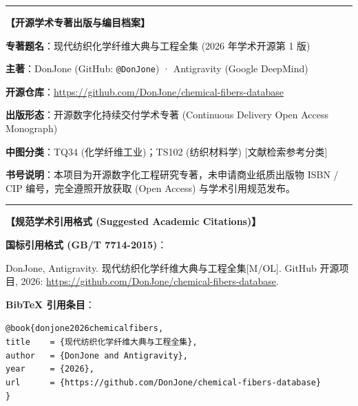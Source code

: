 \documentclass[11pt,openright,twoside,UTF8]{ctexbook}
\begin{document}
\vspace{0.6cm}

\begin{center}
\begin{minipage}{0.88\textwidth}
\small
\noindent\rule{\textwidth}{0.8pt}\par
\vspace{0.3cm}
\noindent\textbf{【开源学术专著出版与编目档案】}\par
\vspace{0.2cm}
\noindent\textbf{专著题名}：现代纺织化学纤维大典与工程全集 (2026 年学术开源第 1 版)\par
\noindent\textbf{主\quad\quad 著}：DonJone (GitHub: \texttt{@DonJone}) · Antigravity (Google DeepMind)\par
\noindent\textbf{开源仓库}：\url{https://github.com/DonJone/chemical-fibers-database}\par
\noindent\textbf{出版形态}：开源数字化持续交付学术专著 (Continuous Delivery Open Access Monograph)\par
\noindent\textbf{中图分类}：TQ34 (化学纤维工业)；TS102 (纺织材料学) [文献检索参考分类]\par
\noindent\textbf{书号说明}：本项目为开源数字化工程研究专著，未申请商业纸质出版物 ISBN / CIP 编号，完全遵照开放获取 (Open Access) 与学术引用规范发布。\par
\vspace{0.2cm}
\noindent\rule{\textwidth}{0.8pt}
\end{minipage}
\end{center}

\vspace{0.5cm}

\begin{center}
\begin{minipage}{0.88\textwidth}
\small
\noindent\textbf{【规范学术引用格式 (Suggested Academic Citations)】}\par
\vspace{0.2cm}
\noindent\textbf{国标引用格式 (GB/T 7714-2015)}：\par
\noindent DonJone, Antigravity. 现代纺织化学纤维大典与工程全集[M/OL]. GitHub 开源项目, 2026: \url{https://github.com/DonJone/chemical-fibers-database}.\par
\vspace{0.3cm}
\noindent\textbf{BibTeX 引用条目}：\par
\vspace{0.1cm}
\noindent\texttt{@book\{donjone2026chemicalfibers,}\\
\noindent\texttt{\quad title\ \ \ \ = \{现代纺织化学纤维大典与工程全集\},}\\
\noindent\texttt{\quad author\ \ \ = \{DonJone and Antigravity\},}\\
\noindent\texttt{\quad year\ \ \ \ \ = \{2026\},}\\
\noindent\texttt{\quad url\ \ \ \ \ \ = \{https://github.com/DonJone/chemical-fibers-database\}}\\
\noindent\texttt{\}}
\end{minipage}
\end{center}
\end{document}
